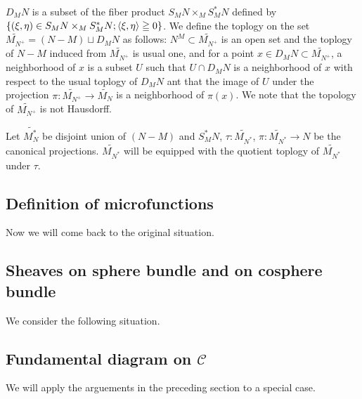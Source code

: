 $D_{M}N$ is a subset of the fiber 
product $S_{M}N\times_{M}S_{M}^{\ast}N$ defined 
by $\{(\xi,\eta)\in S_{M}N\times_{M}S_{M}^{\ast}N; 
\inner<\xi,\eta>\geqq 0\}$. 
We define the toplogy on the 
set $\widetilde{M_{N^+}} = (N-M) \sqcup D_{M}N$ as 
follows: $N^M \subset \widetilde{M_{N^+}}$ is an open set 
and the toplogy of $N-M$ induced from $\widetilde{M_{N^+}}$ is 
usual one, and for 
a point $x\in D_{M}N \subset \widetilde{M_{N^+}}$, a 
neighborhood of $x$ is a subset $U$ such 
that $U\cap D_{M}N$ is a neighborhood of $x$ with 
respect to the usual toplogy of $D_{M}N$ ant that 
the image of $U$ under the 
projection $\pi\colon \widetilde{M_{N^+}}\to 
\widetilde{M_{N}}$ is a neighborhood of $\pi(x)$. We note that 
the topology of $\widetilde{M_{N^+}}$ is not Hausdorff.

Let $\widetilde{M_N^{\ast}}$ be disjoint union 
of $(N-M)$ and $S_{M}^{\ast}N$, $\tau\colon 
\widetilde{M_{N^{\ast}}}$, $\pi\colon 
\widetilde{M_{N^{\ast}}}\to N$ be the canonical projections. 
$\widetilde{M_{N^{\ast}}}$ will be equipped 
with the quotient toplogy 
of $\widetilde{M_{N^{\ast}}}$ under $\tau$.  

\subsection{Definition of microfunctions}


Now we will come back to the original situation. 




\subsection{Sheaves on sphere bundle and on cosphere bundle}


We consider the following situation.



\subsection{Fundamental diagram on $\mathscr{C}$}


We will apply the arguements in the preceding section 
to a special case.

